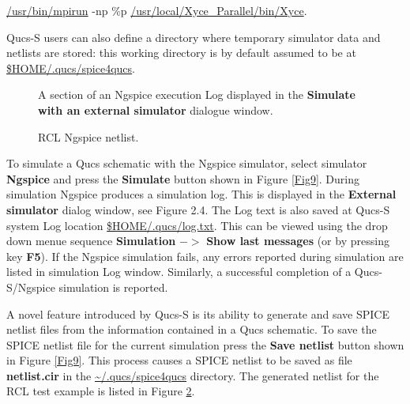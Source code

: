 \url{/usr/bin/mpirun} -np \%p  \url{/usr/local/Xyce_Parallel/bin/Xyce}.
\newline

\noindent Qucs-S users can also define a directory where temporary simulator data and netlists are stored: this working directory is by default assumed to be at \url{$HOME/.qucs/spice4qucs}.
 \begin{figure}[h]
	\centering
	\caption{ A section of an Ngspice execution Log displayed in the\textbf{ Simulate with an external simulator} dialogue window.}
	\label{Fig11}
\end{figure}
 \begin{figure}[ht]
	\centering
	\caption{RCL Ngspice netlist. }
	\label{Fig12}
\end{figure}
To simulate a Qucs schematic with the Ngspice simulator, select simulator\textbf{ Ngspice} and press the \textbf{Simulate} button shown in Figure \ref{Fig9}.  During simulation Ngspice produces a simulation log. This is displayed in the\textbf{ External simulator} dialog window, see Figure 2.4. The Log text is also saved at Qucs-S system Log location \url{$HOME/.qucs/log.txt}. This can be viewed using the drop down menue sequence \textbf{Simulation} $->$ \textbf{Show last messages} (or by pressing key \textbf{F5}). If the Ngspice simulation fails, any errors reported during simulation are listed in simulation Log window. Similarly, a successful completion of a Qucs-S/Ngspice simulation is reported.
\newline

\noindent A novel feature introduced by Qucs-S is its ability to generate and save SPICE netlist files from the information contained in a Qucs schematic. To save the SPICE netlist file for the current simulation press the \textbf{Save netlist} button shown in Figure \ref{Fig9}. This process causes a SPICE netlist to be saved as file \textbf{netlist.cir} in the \url{~/.qucs/spice4qucs} directory. The generated netlist for the RCL test example is listed in Figure \ref{Fig12}.


